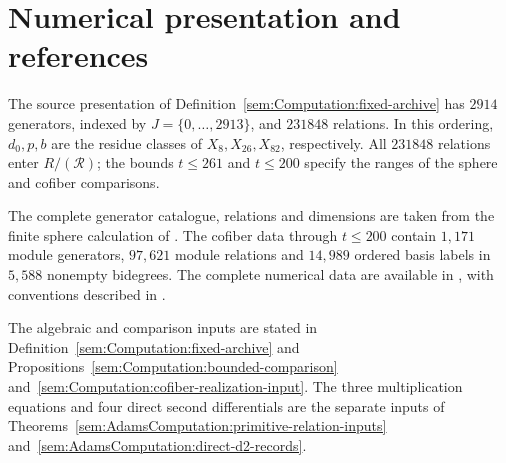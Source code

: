 \section{Numerical presentation and references}

The source presentation of Definition~\ref{sem:Computation:fixed-archive}
has $2914$ generators, indexed by $J=\{0,\ldots,2913\}$, and $231848$
relations. In this ordering, $d_0,p,b$ are the residue classes of
$X_8,X_{26},X_{82}$, respectively. All $231848$ relations enter
$R/(\mathcal R)$; the bounds $t\leq261$ and $t\leq200$ specify the
ranges of the sphere and cofiber comparisons.

The complete generator catalogue, relations and dimensions are taken
from the finite sphere calculation of \cite{LinProgram}.
The cofiber data through $t\leq200$ contain $1{,}171$ module generators,
$97{,}621$ module relations and $14{,}989$ ordered basis labels in
$5{,}588$ nonempty bidegrees. The complete numerical data are available
in \cite{LWXZenodoCurrent}, with conventions described in
\cite{LinProgram,LWXMachine}.

The algebraic and comparison inputs are stated in
Definition~\ref{sem:Computation:fixed-archive} and
Propositions~\ref{sem:Computation:bounded-comparison}
and~\ref{sem:Computation:cofiber-realization-input}.
The three multiplication equations and four direct second
differentials are the separate inputs of
Theorems~\ref{sem:AdamsComputation:primitive-relation-inputs}
and~\ref{sem:AdamsComputation:direct-d2-records}.
